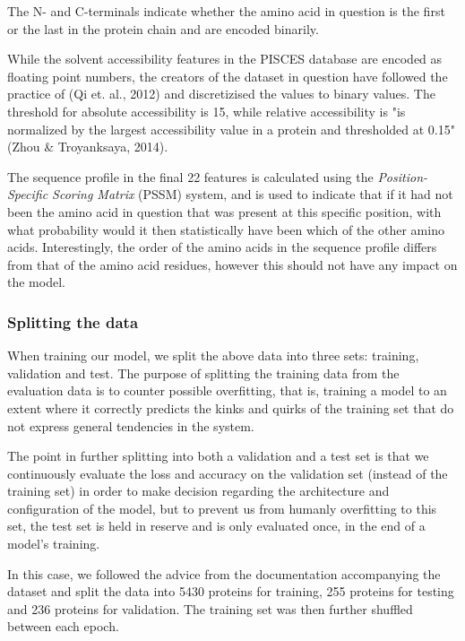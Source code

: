 \begin{multicols}{2}
\noindent The N- and C-terminals indicate whether the amino acid in question is the first or the last in the protein chain and are encoded binarily.

While the solvent accessibility features in the PISCES database are encoded as floating point numbers, the creators of the dataset in question have followed the practice of (Qi et. al., 2012) and discretizised the values to binary values. The threshold for absolute accessibility is 15, while relative accessibility is "is normalized by the largest accessibility value in a protein and thresholded at 0.15" (Zhou \& Troyanksaya, 2014).

The sequence profile in the final 22 features is calculated using the \textit{Position-Specific Scoring Matrix} (PSSM) system, and is used to indicate that if it had not been the amino acid in question that was present at this specific position, with what probability would it then statistically have been which of the other amino acids. Interestingly, the order of the amino acids in the sequence profile differs from that of the amino acid residues, however this should not have any impact on the model.


\subsubsection{Splitting the data}
When training our model, we split the above data into three sets: training, validation and test. The purpose of splitting the training data from the evaluation data is to counter possible overfitting, that is, training a model to an extent where it correctly predicts the kinks and quirks of the training set that do not express general tendencies in the system.

The point in further splitting into both a validation and a test set is that we continuously evaluate the loss and accuracy on the validation set (instead of the training set) in order to make decision regarding the architecture and configuration of the model, but to prevent us from humanly overfitting to this set, the test set is held in reserve and is only evaluated once, in the end of a model's training.

In this case, we followed the advice from the documentation accompanying the dataset and split the data into 5430 proteins for training, 255 proteins for testing and 236 proteins for validation. The training set was then further shuffled between each epoch.


\end{multicols}
